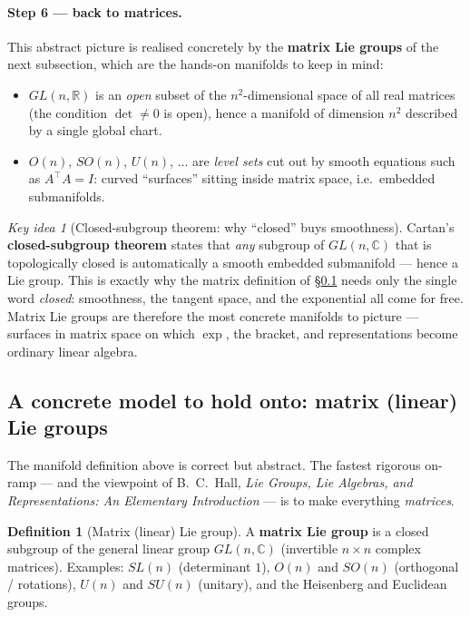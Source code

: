\documentclass[11pt]{article}
\theoremstyle{definition}
\newtheorem{definition}{Definition}[section]
\theoremstyle{remark}
\newtheorem*{keyidea}{Key idea}
\newcommand{\R}{\mathbb{R}}
\begin{document}
\paragraph{Step 6 --- back to matrices.}
This abstract picture is realised concretely by the \textbf{matrix Lie groups} of the next subsection,
which are the hands-on manifolds to keep in mind:
\begin{itemize}[nosep]
  \item $GL(n,\R)$ is an \emph{open} subset of the $n^2$-dimensional space of all real matrices (the
        condition $\det\neq0$ is open), hence a manifold of dimension $n^2$ described by a single global
        chart.
  \item $O(n)$, $SO(n)$, $U(n)$, $\dots$ are \emph{level sets} cut out by smooth equations such as
        $A^{\top}A=I$: curved ``surfaces'' sitting inside matrix space, i.e.\ embedded submanifolds.
\end{itemize}
\begin{keyidea}[Closed-subgroup theorem: why ``closed'' buys smoothness]
Cartan's \textbf{closed-subgroup theorem} states that \emph{any} subgroup of $GL(n,\mathbb{C})$ that is
topologically closed is automatically a smooth embedded submanifold --- hence a Lie group. This is exactly
why the matrix definition of \S\ref{sec:matrix} needs only the single word \emph{closed}: smoothness, the
tangent space, and the exponential all come for free. Matrix Lie groups are therefore the most concrete
manifolds to picture --- surfaces in matrix space on which $\exp$, the bracket, and representations become
ordinary linear algebra.
\end{keyidea}

\subsection{A concrete model to hold onto: matrix (linear) Lie groups}
\label{sec:matrix}

The manifold definition above is correct but abstract. The fastest rigorous on-ramp --- and the viewpoint
of B.~C.~Hall, \emph{Lie Groups, Lie Algebras, and Representations: An Elementary Introduction} --- is to
make everything \emph{matrices}.

\begin{definition}[Matrix (linear) Lie group]
A \textbf{matrix Lie group} is a closed subgroup of the general linear group $GL(n,\mathbb{C})$
(invertible $n\times n$ complex matrices). Examples: $SL(n)$ (determinant $1$), $O(n)$ and $SO(n)$
(orthogonal / rotations), $U(n)$ and $SU(n)$ (unitary), and the Heisenberg and Euclidean groups.
\end{definition}
\end{document}
